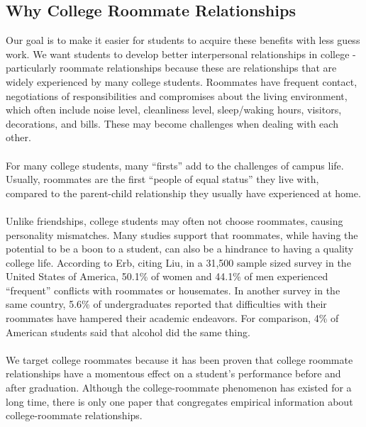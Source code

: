 \documentclass[11pt, draft, journal]{./IEEE/IEEEtran}
\begin{document}
    \subsection{Why College Roommate Relationships}
    Our goal is to make it easier for students to acquire these benefits with less guess work. We want students to develop better interpersonal relationships in college - particularly roommate relationships because these are relationships that are widely experienced by many college students\cite{erb}. Roommates have frequent contact, negotiations of responsibilities and compromises about the living environment, which often include noise level, cleanliness level, sleep/waking hours, visitors, decorations, and bills\cite{erb}. These may become challenges when dealing with each other.
    \\
    \\
    \indent For many college students, many ``firsts'' add to the challenges of campus life. Usually, roommates are the first ``people of equal status'' they live with, compared to the parent-child relationship they usually have experienced at home\cite{erb}.
    \\
    \\
    \indent Unlike friendships, college students may often not choose roommates, causing personality mismatches. Many studies support that roommates, while having the potential to be a boon to a student, can also be a hindrance to having a quality college life. According to Erb\cite{erb}, citing Liu\cite{liu}, in a 31,500 sample sized survey in the United States of America, 50.1\% of women and 44.1\% of men experienced “frequent” conflicts with roommates or housemates. In another survey in the same country, 5.6\% of undergraduates reported that difficulties with their roommates have hampered their academic endeavors\cite{erb}. For comparison, 4\% of American students said that alcohol did the same thing\cite{erb}.
    \\
    \\
    \indent We target college roommates because it has been proven that college roommate relationships have a momentous effect on a student's performance before and after graduation. Although the college-roommate phenomenon has existed for a long time, there is only one paper that congregates empirical information about college-roommate relationships\cite{erb}.
\end{document}
